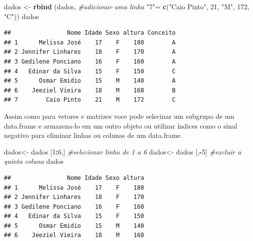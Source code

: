 \documentclass[]{book}
\newenvironment{Shaded}{\begin{snugshade}}{\end{snugshade}}
\newcommand{\CommentTok}[1]{\textcolor[rgb]{0.56,0.35,0.01}{\textit{#1}}}
\newcommand{\DecValTok}[1]{\textcolor[rgb]{0.00,0.00,0.81}{#1}}
\newcommand{\KeywordTok}[1]{\textcolor[rgb]{0.13,0.29,0.53}{\textbf{#1}}}
\newcommand{\NormalTok}[1]{#1}
\newcommand{\OperatorTok}[1]{\textcolor[rgb]{0.81,0.36,0.00}{\textbf{#1}}}
\newcommand{\StringTok}[1]{\textcolor[rgb]{0.31,0.60,0.02}{#1}}
\begin{document}
\begin{Shaded}
\begin{Highlighting}[]
\NormalTok{dados <-}\StringTok{ }\KeywordTok{rbind}\NormalTok{ (dados, }\CommentTok{#adicionar uma linha}
                \StringTok{"7"}\NormalTok{=}\StringTok{ }\KeywordTok{c}\NormalTok{(}\StringTok{"Caio Pinto"}\NormalTok{, }\DecValTok{21}\NormalTok{, }\StringTok{"M"}\NormalTok{, }\DecValTok{172}\NormalTok{, }\StringTok{"C"}\NormalTok{))}
\NormalTok{dados}
\end{Highlighting}
\end{Shaded}

\begin{verbatim}
##                Nome Idade Sexo altura Conceito
## 1      Melissa José    17    F    180        A
## 2 Jennifer Linhares    18    F    170        A
## 3 Gedilene Ponciano    16    F    160        A
## 4   Edinar da Silva    15    F    150        C
## 5      Osmar Emidio    15    M    140        A
## 6    Jeeziel Vieira    18    M    168        B
## 7        Caio Pinto    21    M    172        C
\end{verbatim}

Assim como para vetores e matrizes voce pode selecinar um subgrupo de um data.frame e armazena-lo em um outro objeto ou utilizar índices como o sinal negativo para eliminar linhas ou colunas de um data.frame.

\begin{Shaded}
\begin{Highlighting}[]
\NormalTok{dados<-}\StringTok{ }\NormalTok{dados [}\DecValTok{1}\OperatorTok{:}\DecValTok{6}\NormalTok{,] }\CommentTok{#selecionar linha de 1 a 6}
\NormalTok{dados<-}\StringTok{ }\NormalTok{dados [,}\OperatorTok{-}\DecValTok{5}\NormalTok{] }\CommentTok{#excluir a quinta coluna}
\NormalTok{dados}
\end{Highlighting}
\end{Shaded}

\begin{verbatim}
##                Nome Idade Sexo altura
## 1      Melissa José    17    F    180
## 2 Jennifer Linhares    18    F    170
## 3 Gedilene Ponciano    16    F    160
## 4   Edinar da Silva    15    F    150
## 5      Osmar Emidio    15    M    140
## 6    Jeeziel Vieira    18    M    168
\end{verbatim}

\begin{Shaded}
\end{Shaded}
\end{document}
